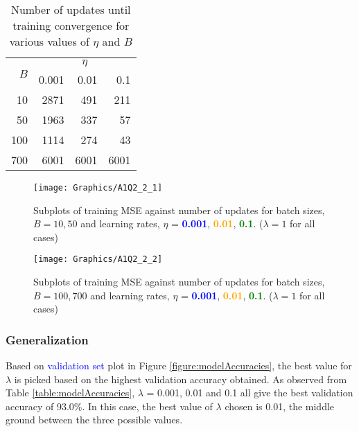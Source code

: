 \documentclass[a4paper,12pt]{article}
\begin{document}
\begin{table}[ht]
	\centering %
    \caption{Number of updates until training convergence for various values of 
    	$\eta$ and $B$} %
	\label{table:etaBatchSizeAndNumUpdates} %
    \vspace{1em}
	\begin{tabular}{r|r r r}
		\toprule
		\multirow{2}{*}{$B$} & \multicolumn{3}{c}{$\eta$} \\
        & 0.001 & 0.01 & 0.1 \\
        \hline
        10 & 2871 & 491 & 211 \\
        50 & 1963 & 337 & 57 \\
        100 & 1114 & 274 & 43 \\
        700 & 6001 & 6001 & 6001 \\
        [1ex] %
		\hline
	\end{tabular}
\end{table}
\clearpage
\begin{figure}[!htb]
	\centering
	\texttt{[image: Graphics/A1Q2\_2\_1]}
    \caption{\label{figure:BatchSubplots_1}Subplots of training MSE 
    against number of updates for batch sizes, $B = 10, 50$ and learning 
    rates, $\eta$ = \textcolor{blue}{\textbf{0.001}}, \textcolor{orange}
    {\textbf{0.01}}, \textcolor{green}{\textbf{0.1}}. ($\lambda = 1$ for
    all cases)}
\end{figure}
\begin{figure}[!htb]
	\centering
	\texttt{[image: Graphics/A1Q2\_2\_2]}
    \caption{\label{figure:BatchSubplots_2}Subplots of training MSE 
    against number of updates for batch sizes, $B = 100, 700$ and learning
    rates, $\eta$ = \textcolor{blue}{\textbf{0.001}}, \textcolor{orange}
    {\textbf{0.01}}, \textcolor{green}{\textbf{0.1}}. ($\lambda = 1$ for 
    all cases)}
\end{figure}
\clearpage
\subsubsection{Generalization}

Based on \textcolor{blue}{validation set} plot in Figure \ref{figure:modelAccuracies}, the best value for $\lambda$ is picked based on the highest validation accuracy obtained. As observed from Table \ref{table:modelAccuracies}, $\lambda$ = 0.001, 0.01 and 0.1 all give the best validation accuracy of 93.0\%. In this case, the best value of $\lambda$ chosen is 0.01, the middle ground between the three possible values.
\end{document}
